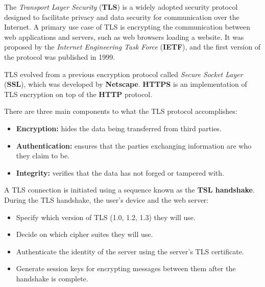The \textit{Transport Layer Security} (\textbf{TLS}) is a widely adopted security protocol designed to facilitate privacy and data security for communication over the Internet. A primary use case of TLS is encrypting the communication between web applications and servers, such as web browsers loading a website. It was proposed by the \textit{Internet Engineering Task Force} (\textbf{IETF}), and the first version of the protocol was published in 1999.

TLS evolved from a previous encryption protocol called \textit{Secure Socket Layer} (\textbf{SSL}), which was developed by \textbf{Netscape}. \textbf{HTTPS} is an implementation of TLS encryption on top of the \textbf{HTTP} protocol.

There are three main components to what the TLS protocol accomplishes:

\begin{itemize}
  \item \textbf{Encryption:} hides the data being transferred from third parties.
  \item \textbf{Authentication:} ensures that the parties exchanging information are who they claim to be.
  \item \textbf{Integrity:} verifies that the data has not forged or tampered with.
\end{itemize}

A TLS  connection is initiated using a sequence known as the \textbf{TSL handshake}. During the TLS handshake, the user's device and the web server:

\begin{itemize}
  \item Specify which version of TLS (1.0, 1.2, 1.3) they will use.
  \item Decide on which cipher suites they will use.
  \item Authenticate the identity of the server using the server's TLS certificate.
  \item Generate session keys for encrypting messages between them after the handshake is complete.
\end{itemize}
